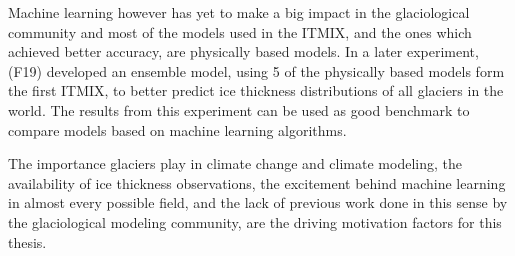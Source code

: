 Machine learning however has yet to make a big impact in the glaciological community and most of the models used in the ITMIX, and the ones which achieved better accuracy, are physically based models. In a later experiment, \citet{Farinotti2019} (F19) developed an ensemble model, using 5 of the physically based models form the first ITMIX, to better predict ice thickness distributions of all glaciers in the world. The results from this experiment can be used as good benchmark to compare models based on machine learning algorithms.

The importance glaciers play in climate change and climate modeling, the availability of ice thickness observations, the excitement behind machine learning in almost every possible field, and the lack of previous work done in this sense by the glaciological modeling community, are the driving motivation factors for this thesis.


%
%


